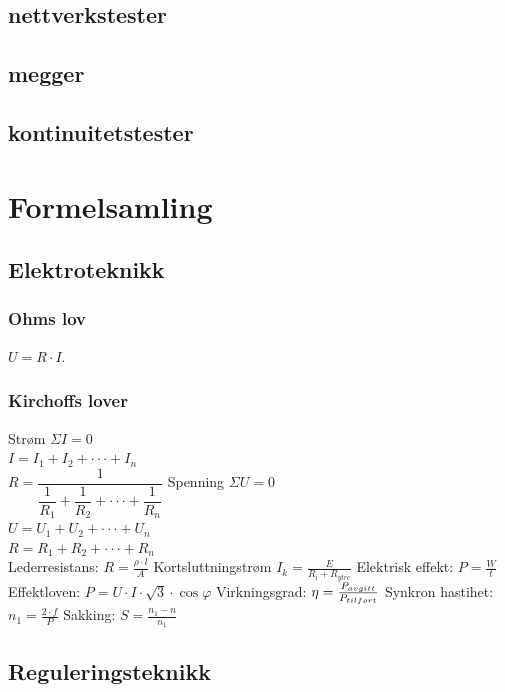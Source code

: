 \documentclass[10pt,a5paper]{article}
\begin{document}
\subsection{nettverkstester}
\subsection{megger}
\subsection{kontinuitetstester}





\vfil \eject
\section{Formelsamling}

\subsection{Elektroteknikk}
\vskip 2.5pt
\subsubsection*{Ohms lov}
\vskip 2.5pt
$U=R\cdot I$.
\vskip 2.5pt
\subsubsection*{Kirchoffs lover}
\vskip 2.5pt  
Strøm $\Sigma I=0$\\
\vskip 2.5pt  
$I=I_{1}+I_{2}+\cdot\cdot\cdot+I_{n}$\\
\vskip 2.5pt  
$R=\dfrac{1}{\dfrac{1}{R_{1}}+\dfrac{1}{R_{2}}+\cdot\cdot\cdot+\dfrac{1}{R_{n}}}$
\vskip 2pt
 Spenning $\Sigma U=0$\\
\vskip 2.5pt  
$U=U_{1}+U_{2}+\cdot\cdot\cdot+U_{n}$\\
\vskip 2.5pt  
$R=R_{1}+R_{2}+\cdot\cdot\cdot+R_{n}$\\
\vskip 2pt
Lederresistans: $ R=\frac{\rho\cdot l}{A}$ 
\vskip 2pt
Kortsluttningstrøm $I_{k}=\frac{E}{R_{i}+R_{ytre}}$
\vskip 2pt
Elektrisk effekt: $P=\frac{W}{t}$
\vskip 2pt  
Effektloven: $P=U\cdot I\cdot \sqrt{3} \cdot \cos \varphi$
\vskip 2.5pt  
Virkningsgrad: $\eta=\frac{P_{avgitt}}{P_{tilf\\ort}}$
\vskip 2.5pt
Synkron hastihet: $n_1=\frac{2\cdot f}{P}$
\vskip 2.5pt 
Sakking: $S=\frac{n_1-n}{n_1}$
\vskip 2.5pt 
\subsection{Reguleringsteknikk}
\vskip 2.5pt 
\end{document}
